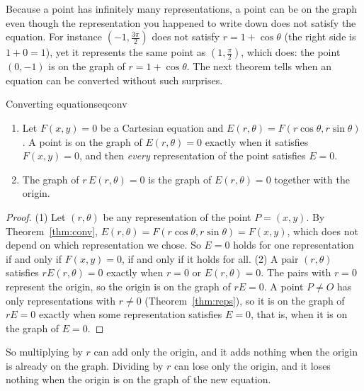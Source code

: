\documentclass[11pt]{article}
\begin{document}
Because a point has infinitely many representations, a point can be on the graph even though the representation you happened to write down does not satisfy the equation. For instance $\left(-1,\frac{3\pi}2\right)$ does not satisfy $r=1+\cos\theta$ (the right side is $1+0=1$), yet it represents the same point as $\left(1,\frac\pi2\right)$, which does: the point $(0,-1)$ is on the graph of $r=1+\cos\theta$. The next theorem tells when an equation can be converted without such surprises.

\begin{thm}{Converting equations}{eqconv}
\begin{enumerate}[nosep]
  \item Let $F(x,y)=0$ be a Cartesian equation and $E(r,\theta)=F(r\cos\theta,r\sin\theta)$. A point is on the graph of $E(r,\theta)=0$ exactly when it satisfies $F(x,y)=0$, and then \emph{every} representation of the point satisfies $E=0$.
  \item The graph of $r\,E(r,\theta)=0$ is the graph of $E(r,\theta)=0$ together with the origin.
\end{enumerate}
\end{thm}
\begin{proof}
(1) Let $(r,\theta)$ be any representation of the point $P=(x,y)$. By Theorem~\ref{thm:conv}, $E(r,\theta)=F(r\cos\theta,r\sin\theta)=F(x,y)$, which does not depend on which representation we chose. So $E=0$ holds for one representation if and only if $F(x,y)=0$, if and only if it holds for all.
(2) A pair $(r,\theta)$ satisfies $rE(r,\theta)=0$ exactly when $r=0$ or $E(r,\theta)=0$. The pairs with $r=0$ represent the origin, so the origin is on the graph of $rE=0$. A point $P\ne O$ has only representations with $r\ne0$ (Theorem~\ref{thm:reps}), so it is on the graph of $rE=0$ exactly when some representation satisfies $E=0$, that is, when it is on the graph of $E=0$.
\end{proof}

So multiplying by $r$ can add only the origin, and it adds nothing when the origin is already on the graph. Dividing by $r$ can lose only the origin, and it loses nothing when the origin is on the graph of the new equation.
\end{document}
